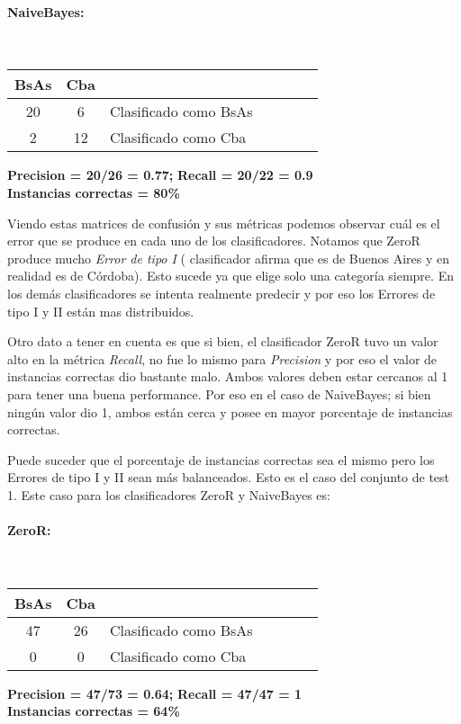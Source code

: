 \paragraph*{NaiveBayes:}\mbox{}\\
\begin{table}[H]
\centering
\begin{tabular}{|c|c|l|c|c|c|c|}
\hline
 BsAs & Cba &  \\ \hline
 20 &  6 &  Clasificado como BsAs \\ \hline
 2  &  12 &  Clasificado como Cba \\ \hline
\end{tabular}
\end{table}
\begin{center}
\textbf{Precision = 20/26 = 0.77;} \textbf{Recall = 20/22 = 0.9}\\
\textbf{Instancias correctas = 80\%}
\end{center}

Viendo estas matrices de confusión y sus métricas podemos observar cuál es el error que se produce en cada uno de los clasificadores. Notamos que ZeroR produce mucho \textit{Error de tipo I} ( clasificador afirma que es de Buenos Aires y en realidad es de Córdoba). Esto sucede ya que elige solo una categoría siempre. En los demás clasificadores se intenta realmente predecir y por eso los Errores de tipo I y II están mas distribuidos.

Otro dato a tener en cuenta es que si bien, el clasificador ZeroR tuvo un valor alto en la métrica \textit{Recall}, no fue lo mismo para \textit{Precision} y por eso el valor de instancias correctas dio bastante malo. Ambos valores deben estar cercanos al 1 para tener una buena performance. Por eso en el caso de NaiveBayes; si bien ningún valor dio 1, ambos están cerca y posee en mayor porcentaje de instancias correctas.

Puede suceder que el porcentaje de instancias correctas sea el mismo pero los Errores de tipo I y II sean más balanceados. Esto es el caso del conjunto de test 1. Este caso para los clasificadores ZeroR y NaiveBayes es:

\paragraph*{ZeroR:}\mbox{}\\
\begin{table}[H]
\centering
\begin{tabular}{|c|c|l|c|c|c|c|}
\hline
 BsAs & Cba &  \\ \hline
 47 &  26 &  Clasificado como BsAs \\ \hline
 0 &  0 &  Clasificado como Cba \\ \hline
\end{tabular}
\end{table}
\begin{center}
\textbf{Precision = 47/73 = 0.64;} \textbf{Recall = 47/47 = 1}\\
\textbf{Instancias correctas = 64\%}
\end{center}

